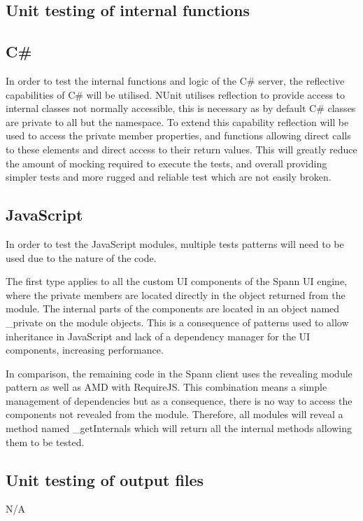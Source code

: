 \documentclass[12pt, titlepage]{article}
\begin{document}
\subsection{Unit testing of internal functions}

\subsection{C\#}
In order to test the internal functions and logic of the C\# server, the
reflective capabilities of C\# will be utilised. NUnit utilises reflection to
provide access to internal classes not normally accessible, this is necessary
as by default C\# classes are private to all but the namespace. To extend this
capability reflection will be used to access the private member properties, and
functions allowing direct calls to these elements and direct access to their
return values. This will greatly reduce the amount of mocking required to
execute the tests, and overall providing simpler tests and more rugged and
reliable test which are not easily broken. 

\subsection{JavaScript} In order to test the JavaScript modules, multiple tests
patterns will need to be used due to the nature of the code. 

The first type applies to all the custom UI components of the Spann UI engine,
where the private members are located directly in the object returned from the
module. The internal parts of the components are located in an object named
\_private on the module objects. This is a consequence of patterns used to allow
inheritance in JavaScript and lack of a dependency manager for the UI
components, increasing performance.  

In comparison, the remaining code in the Spann client uses the revealing module
pattern as well as AMD with RequireJS. This combination means a simple
management of dependencies but as a consequence, there is no way to access the
components not revealed from the module. Therefore, all modules will reveal a
method named \_getInternals which will return all the internal methods allowing
them to be tested. 

		
\subsection{Unit testing of output files}		
N/A
\end{document}
